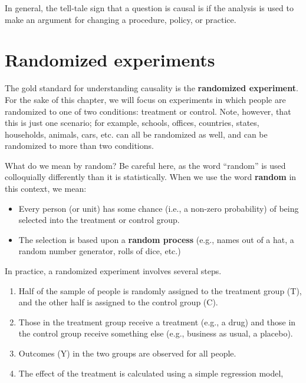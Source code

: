 \documentclass[
  letterpaper,
  DIV=11,
  numbers=noendperiod]{scrreprt}
\providecommand{\tightlist}{%
  \setlength{\itemsep}{0pt}\setlength{\parskip}{0pt}}\usepackage{longtable,booktabs,array}
\theoremstyle{definition}
\theoremstyle{remark}
\begin{document}
In general, the tell-tale sign that a question is causal is if the
analysis is used to make an argument for changing a procedure, policy,
or practice.

\hypertarget{sec-randomized-experiments}{%
\section{Randomized experiments}\label{sec-randomized-experiments}}

The gold standard for understanding causality is the \textbf{randomized
experiment}. For the sake of this chapter, we will focus on experiments
in which people are randomized to one of two conditions: treatment or
control. Note, however, that this is just one scenario; for example,
schools, offices, countries, states, households, animals, cars, etc. can
all be randomized as well, and can be randomized to more than two
conditions.

What do we mean by random? Be careful here, as the word ``random'' is
used colloquially differently than it is statistically. When we use the
word \textbf{random} in this context, we mean:

\begin{itemize}
\tightlist
\item
  Every person (or unit) has some chance (i.e., a non-zero probability)
  of being selected into the treatment or control group.
\item
  The selection is based upon a \textbf{random process} (e.g., names out
  of a hat, a random number generator, rolls of dice, etc.)
\end{itemize}

In practice, a randomized experiment involves several steps.

\begin{enumerate}
\def\labelenumi{\arabic{enumi}.}
\tightlist
\item
  Half of the sample of people is randomly assigned to the treatment
  group (T), and the other half is assigned to the control group (C).
\item
  Those in the treatment group receive a treatment (e.g., a drug) and
  those in the control group receive something else (e.g., business as
  usual, a placebo).
\item
  Outcomes (Y) in the two groups are observed for all people.
\item
  The effect of the treatment is calculated using a simple regression
  model,
\end{enumerate}
\end{document}
